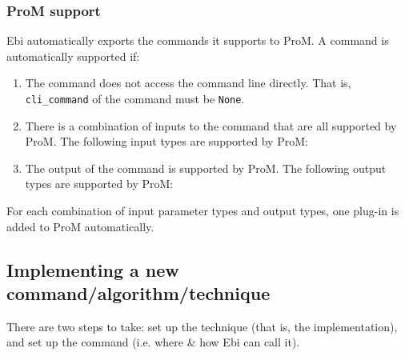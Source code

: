 \documentclass{article}
\begin{document}
		\subsubsection{ProM support}
			Ebi automatically exports the commands it supports to ProM.
			A command is automatically supported if:
			\begin{enumerate}
				\item The command does not access the command line directly.
				That is, \verb=cli_command= of the command must be \verb=None=.
				\item There is a combination of inputs to the command that are all supported by ProM.
				The following input types are supported by ProM:
				\ebiprominput
				
				\item The output of the command is supported by ProM.
				The following output types are supported by ProM:
				\ebipromoutput
			\end{enumerate}
			For each combination of input parameter types and output types, one plug-in is added to ProM automatically.
            
	\subsection{Implementing a new command/algorithm/technique}
	\label{sec:implement}
		There are two steps to take: set up the technique (that is, the implementation), and set up the command (i.e. where \& how Ebi can call it).
		
\end{document}
